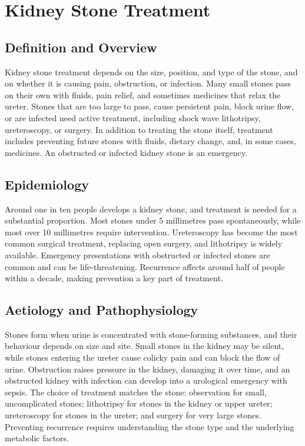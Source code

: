 \chapter{Kidney Stone Treatment}

\section*{Definition and Overview}
Kidney stone treatment depends on the size, position, and type of the stone, and on whether it is causing pain, obstruction, or infection. Many small stones pass on their own with fluids, pain relief, and sometimes medicines that relax the ureter. Stones that are too large to pass, cause persistent pain, block urine flow, or are infected need active treatment, including shock wave lithotripsy, ureteroscopy, or surgery. In addition to treating the stone itself, treatment includes preventing future stones with fluids, dietary change, and, in some cases, medicines. An obstructed or infected kidney stone is an emergency.

\section*{Epidemiology}
Around one in ten people develops a kidney stone, and treatment is needed for a substantial proportion. Most stones under 5 millimetres pass spontaneously, while most over 10 millimetres require intervention. Ureteroscopy has become the most common surgical treatment, replacing open surgery, and lithotripsy is widely available. Emergency presentations with obstructed or infected stones are common and can be life-threatening. Recurrence affects around half of people within a decade, making prevention a key part of treatment.

\section*{Aetiology and Pathophysiology}
Stones form when urine is concentrated with stone-forming substances, and their behaviour depends on size and site. Small stones in the kidney may be silent, while stones entering the ureter cause colicky pain and can block the flow of urine. Obstruction raises pressure in the kidney, damaging it over time, and an obstructed kidney with infection can develop into a urological emergency with sepsis. The choice of treatment matches the stone: observation for small, uncomplicated stones; lithotripsy for stones in the kidney or upper ureter; ureteroscopy for stones in the ureter; and surgery for very large stones. Preventing recurrence requires understanding the stone type and the underlying metabolic factors.

